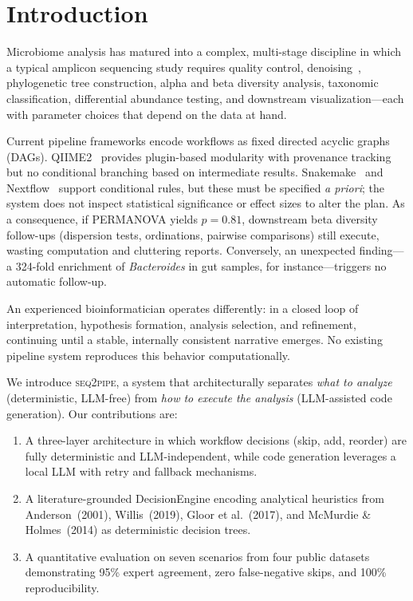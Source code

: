 \documentclass[11pt,a4paper]{article}
\newcommand{\seqpipe}{\textsc{seq2pipe}}
\begin{document}
\section{Introduction}
\label{sec:intro}

Microbiome analysis has matured into a complex, multi-stage
discipline in which a typical amplicon sequencing study requires
quality control, denoising~\citep{callahan2016}, phylogenetic tree
construction, alpha and beta diversity analysis, taxonomic
classification, differential abundance testing, and downstream
visualization---each with parameter choices that depend on the data
at hand.

Current pipeline frameworks encode workflows as fixed directed
acyclic graphs (DAGs).
QIIME2~\citep{qiime2} provides plugin-based modularity with
provenance tracking but no conditional branching based on
intermediate results.
Snakemake~\citep{snakemake} and Nextflow~\citep{nextflow} support
conditional rules, but these must be specified \textit{a priori};
the system does not inspect statistical significance or effect
sizes to alter the plan.
As a consequence, if PERMANOVA yields $p = 0.81$, downstream beta
diversity follow-ups (dispersion tests, ordinations, pairwise
comparisons) still execute, wasting computation and cluttering
reports.
Conversely, an unexpected finding---a 324-fold enrichment of
\textit{Bacteroides} in gut samples, for instance---triggers no
automatic follow-up.

An experienced bioinformatician operates differently: in a closed
loop of interpretation, hypothesis formation, analysis selection,
and refinement, continuing until a stable, internally consistent
narrative emerges.
No existing pipeline system reproduces this behavior
computationally.

We introduce \seqpipe, a system that architecturally separates
\textit{what to analyze} (deterministic, LLM-free) from
\textit{how to execute the analysis} (LLM-assisted code generation).
Our contributions are:
\begin{enumerate}
  \item A three-layer architecture in which workflow decisions
        (skip, add, reorder) are fully deterministic and
        LLM-independent, while code generation leverages a local
        LLM with retry and fallback mechanisms.
  \item A literature-grounded DecisionEngine encoding analytical
        heuristics from Anderson~(2001), Willis~(2019),
        Gloor et al.~(2017), and McMurdie \& Holmes~(2014) as
        deterministic decision trees.
  \item A quantitative evaluation on seven scenarios from four
        public datasets demonstrating 95\% expert agreement,
        zero false-negative skips, and 100\% reproducibility.
\end{enumerate}
\end{document}
